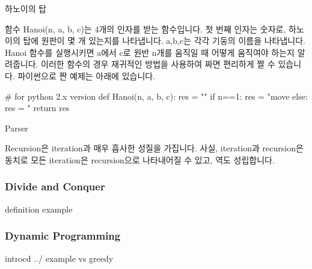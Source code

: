 \begin{compactitem}
\item 하노이의 탑 

함수 Hanoi(n, a, b, c)는 4개의 인자를 받는 함수입니다. 첫 번째 인자는 숫자로, 하노이의 탑에 원판이 몇 개 있는지를 나타냅니다. a,b,c는 각각 기둥의 이름을 나타냅니다. Hanoi 함수를 실행시키면  a에서 c로 원반 n개를 움직일 때 어떻게 움직여야 하는지 알려줍니다. 이러한 함수의 경우 재귀적인 방법을 사용하여 짜면 편리하게 짤 수 있습니다. 파이썬으로 짠 예제는 아래에 있습니다. 

\begin{Python}
# for python 2.x version
def Hanoi(n, a, b, c):
    res = ""
    if n==1:
        res = "move %
    else:
        res = "%
    return res
\end{Python}

\item Parser



\end{compactitem}

Recursion은 iteration과 매우 흡사한 성질을 가집니다. 사실, iteration과 recursion은 동치로 모든 iteration은 recursion으로 나타내어질 수 있고, 역도 성립합니다. 




\subsubsection{Divide and Conquer}

definition
example 


\subsubsection{Dynamic Programming}

introcd ../
example
vs greedy 


\newpage


